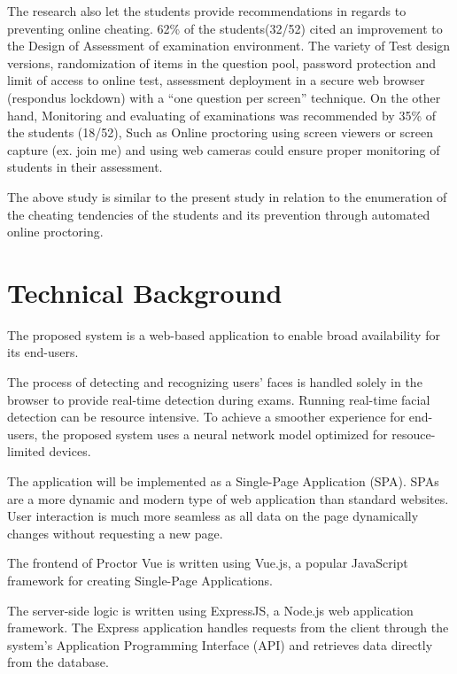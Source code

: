 The research also let the students provide recommendations in regards to preventing online cheating.
62\% of the students(32/52) cited an improvement to the Design of Assessment of examination environment.
The variety of Test design versions, randomization of items in the question pool, password protection and limit of access to online test, assessment deployment in a secure web browser (respondus lockdown) with a “one question per screen” technique.
On the other hand, Monitoring and evaluating of examinations was recommended by 35\% of the students (18/52), Such as Online proctoring using screen viewers or screen capture (ex. join me) and using web cameras could ensure proper monitoring of students in their assessment.

The above study is similar to the present study in relation to the enumeration of the cheating tendencies of the students and its prevention through automated online proctoring.

\section{Technical Background}


The proposed system is a web-based application to enable broad availability for its end-users.

The process of detecting and recognizing users' faces is handled solely in the browser to provide real-time detection during exams.
Running real-time facial detection can be resource intensive.
To achieve a smoother experience for end-users, the proposed system uses a neural network model optimized for resouce-limited devices.

The application will be implemented as a Single-Page Application (SPA).
SPAs are a more dynamic and modern type of web application than standard websites.
User interaction is much more seamless as all data on the page dynamically changes without requesting a new page.

The frontend of Proctor Vue is written using Vue.js, a popular JavaScript framework for creating Single-Page Applications.

The server-side logic is written using ExpressJS, a Node.js web application framework.
The Express application handles requests from the client through the system's Application Programming Interface (API) and retrieves data directly from the database.

